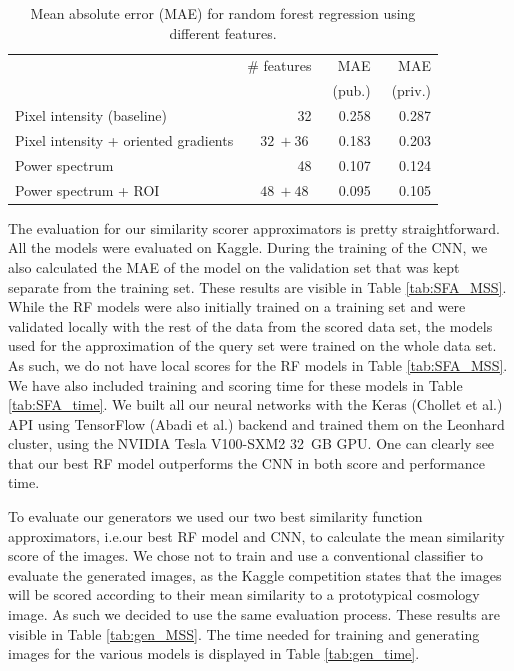 \documentclass[10pt,conference,compsocconf]{IEEEtran}
\begin{document}
\begin{table}\centering
\begin{tabular}{lrrr}
\toprule
& \# features & MAE & MAE \\
& & ~(pub.) & ~(priv.) \\
\midrule
Pixel intensity (baseline) & \SI{32}{} & \SI{0.258}{} & \SI{0.287}{}  \\
Pixel intensity + oriented gradients & $\SI{32}{} + \SI{36}{}$ & \SI{0.183}{} & \SI{0.203}{} \\
Power spectrum & \SI{48}{} & \SI{0.107}{} & \SI{0.124}{} \\
Power spectrum + ROI & $\SI{48}{} + \SI{48}{}$ & \SI{0.095}{} & \SI{0.105}{} \\
\bottomrule
\end{tabular}
\caption{Mean absolute error (MAE) for random forest regression using different features.}
\label{tab:RF}
\end{table}

The evaluation for our similarity scorer approximators is pretty straightforward. All the models were evaluated on Kaggle. During the training of the CNN, we also calculated the MAE of the model on the validation set that was kept separate from the training set. These results are visible in Table \ref{tab:SFA_MSS}. While the RF models were also initially trained on a training set and were validated locally with the rest of the data from the scored data set, the models used for the approximation of the query set were trained on the whole data set. As such, we do not have local scores for the RF models in Table \ref{tab:SFA_MSS}. We have also included training and scoring time for these models in Table \ref{tab:SFA_time}. We built all our neural networks with the Keras (Chollet et al.\@ \cite{chollet2015keras}) API using TensorFlow (Abadi et al.\@ \cite{tensorflow2015-whitepaper}) backend and trained them on the Leonhard cluster, using the NVIDIA Tesla V100-SXM2 \SI{32}{GB} GPU. One can clearly see that our best RF model outperforms the CNN in both score and performance time.

To evaluate our generators we used our two best similarity function approximators, i.e.\@ our best RF model and CNN, to calculate the mean similarity score of the images. We chose not to train and use a conventional classifier to evaluate the generated images, as the Kaggle competition states that the images will be scored according to their mean similarity to a prototypical cosmology image. As such we decided to use the same evaluation process. These results are visible in Table \ref{tab:gen_MSS}. The time needed for training and generating images for the various models is displayed in Table \ref{tab:gen_time}. 
\end{document}
